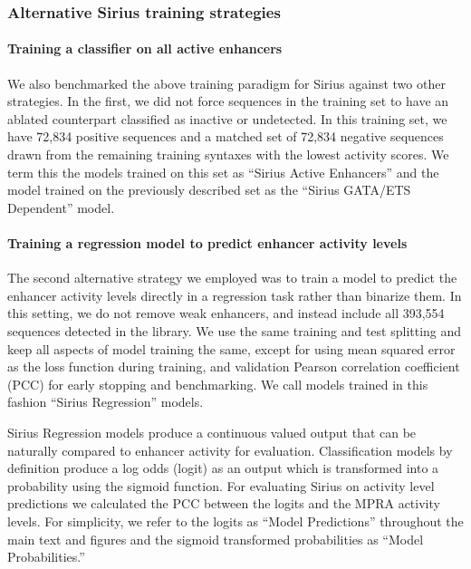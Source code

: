 \subsubsection{Alternative Sirius training strategies}

\paragraph{Training a classifier on all active enhancers}

We also benchmarked the above training paradigm for Sirius against two other strategies. In the first, we did not force sequences in the training set to have an ablated counterpart classified as inactive or undetected. In this training set, we have 72,834 positive sequences and a matched set of 72,834 negative sequences drawn from the remaining training syntaxes with the lowest activity scores. We term this the models trained on this set as “Sirius Active Enhancers” and the model trained on the previously described set as the “Sirius GATA/ETS Dependent” model.

\paragraph{Training a regression model to predict enhancer activity levels}

The second alternative strategy we employed was to train a model to predict the enhancer activity levels directly in a regression task rather than binarize them. In this setting, we do not remove weak enhancers, and instead include all 393,554 sequences detected in the library. We use the same training and test splitting and keep all aspects of model training the same, except for using mean squared error as the loss function during training, and validation Pearson correlation coefficient (PCC) for early stopping and benchmarking. We call models trained in this fashion “Sirius Regression” models. 

Sirius Regression models produce a continuous valued output that can be naturally compared to enhancer activity for evaluation. Classification models by definition produce a log odds (logit) as an output which is transformed into a probability using the sigmoid function. For evaluating Sirius on activity level predictions we calculated the PCC between the logits and the MPRA activity levels. For simplicity, we refer to the logits as “Model Predictions” throughout the main text and figures and the sigmoid transformed probabilities as “Model Probabilities.”

